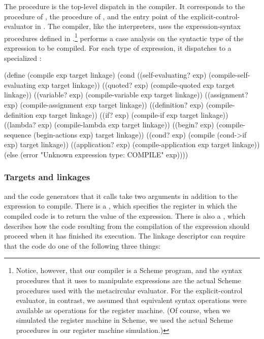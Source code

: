 The procedure  is the top-level dispatch in the compiler.  It
corresponds to the  procedure of , the
 procedure of , and the 
entry point of the explicit-control-evaluator in .  The
compiler, like the interpreters, uses the expression-syntax procedures defined
in .\footnote{Notice, however, that our compiler is a Scheme
program, and the syntax procedures that it uses to manipulate expressions are
the actual Scheme procedures used with the metacircular evaluator.  For the
explicit-control evaluator, in contrast, we assumed that equivalent syntax
operations were available as operations for the register machine.  (Of course,
when we simulated the register machine in Scheme, we used the actual Scheme
procedures in our register machine simulation.)}   performs a
case analysis on the syntactic type of the expression to be compiled.  For each
type of expression, it dispatches to a specialized :

\begin{codeBlock}
(define (compile exp target linkage)
  (cond ((self-evaluating? exp)
         (compile-self-evaluating exp target linkage))
        ((quoted? exp)
         (compile-quoted exp target linkage))
        ((variable? exp)
         (compile-variable exp target linkage))
        ((assignment? exp)
         (compile-assignment exp target linkage))
        ((definition? exp)
         (compile-definition exp target linkage))
        ((if? exp) (compile-if exp target linkage))
        ((lambda? exp)
         (compile-lambda exp target linkage))
        ((begin? exp)
         (compile-sequence
           (begin-actions exp) target linkage))
        ((cond? exp)
         (compile (cond->if exp) target linkage))
        ((application? exp)
         (compile-application exp target linkage))
        (else
          (error "Unknown expression type: COMPILE"
                 exp))))
\end{codeBlock}

\subsubsection*{Targets and linkages}

 and the code generators that it calls take two arguments in
addition to the expression to compile.  There is a , which
specifies the register in which the compiled code is to return the value of the
expression.  There is also a , which describes how
the code resulting from the compilation of the expression should proceed when
it has finished its execution.  The linkage descriptor can require that the
code do one of the following three things:


